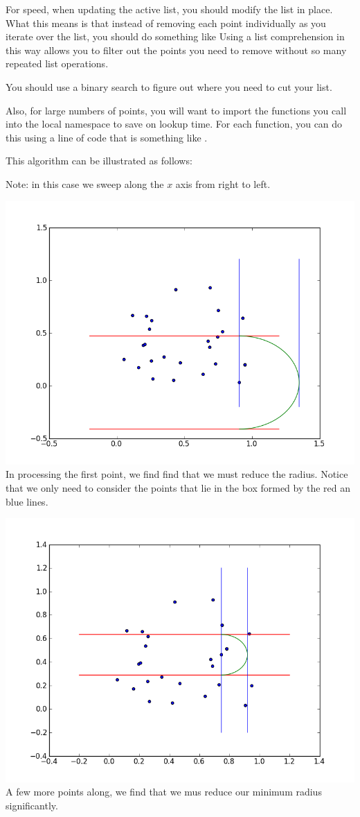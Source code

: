 For speed, when updating the active list, you should modify the list in place. 
What this means is that instead of removing each point individually as you iterate over the list, you should do something like  
Using a list comprehension in this way allows you to filter out the points you need to remove without so many repeated list operations. 

You should use a binary search to figure out where you need to cut your list. 

Also, for large numbers of points, you will want to import the functions you call into the local namespace to save on lookup time. 
For each function, you can do this using a line of code that is something like . 

This algorithm can be illustrated as follows:

Note: in this case we sweep along the $x$ axis from right to left.

\includegraphics[width = \textwidth]{ptsweep1.png}
In processing the first point, we find find that we must reduce the radius. Notice that we only need to consider the points that lie in the box formed by the red an blue lines.


\includegraphics[width = \textwidth]{ptsweep4.png}
A few more points along, we find that we mus reduce our minimum radius significantly.

